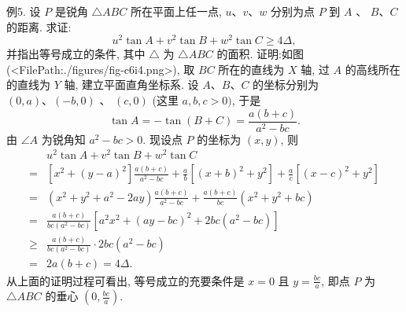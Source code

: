 例5. 设 $P$ 是锐角 $\triangle A B C$ 所在平面上任一点, $u 、 v 、 w$ 分别为点 $P$ 到 $A$ 、 $B 、 C$ 的距离.
求证:
$$
u^2 \tan A+v^2 \tan B+w^2 \tan C \geqslant 4 \Delta,
$$
并指出等号成立的条件, 其中 $\triangle$ 为 $\triangle A B C$ 的面积.
证明:如图(<FilePath:./figures/fig-c6i4.png>), 取 $B C$ 所在的直线为 $X$ 轴, 过 $A$ 的高线所在的直线为 $Y$ 轴, 建立平面直角坐标系.
设 $A 、 B 、 C$ 的坐标分别为 $(0, a) 、(-b, 0)$ 、 $(c, 0)$ (这里 $a, b, c>0)$, 于是
$$
\tan A=-\tan (B+C)=\frac{a(b+c)}{a^2-b c} .
$$
由 $\angle A$ 为锐角知 $a^2-b c>0$.
现设点 $P$ 的坐标为 $(x, y)$, 则
$$
\begin{aligned}
& u^2 \tan A+v^2 \tan B+w^2 \tan C \\
= & {\left[x^2+(y-a)^2\right] \frac{a(b+c)}{a^2-b c}+\frac{a}{b}\left[(x+b)^2+y^2\right]+\frac{a}{c}\left[(x-c)^2+y^2\right] } \\
= & \left(x^2+y^2+a^2-2 a y\right) \frac{a(b+c)}{a^2-b c}+\frac{a(b+c)}{b c}\left(x^2+y^2+b c\right) \\
= & \frac{a(b+c)}{b c\left(a^2-b c\right)}\left[a^2 x^2+(a y-b c)^2+2 b c\left(a^2-b c\right)\right] \\
\geqslant & \frac{a(b+c)}{b c\left(a^2-b c\right)} \cdot 2 b c\left(a^2-b c\right) \\
= & 2 a(b+c)=4 \Delta .
\end{aligned}
$$
从上面的证明过程可看出, 等号成立的充要条件是 $x=0$ 且 $y=\frac{b c}{a}$, 即点 $P$ 为 $\triangle A B C$ 的垂心 $\left(0, \frac{b c}{a}\right)$.



